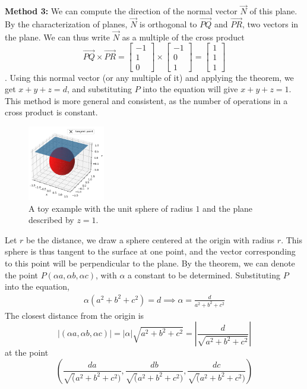 \textbf{Method 3:} We can compute the direction of the normal vector $\vec{N}$ of this plane. By the characterization of planes, $\vec{N}$ is orthogonal to $\overrightarrow{PQ}$ and $\overrightarrow{PR}$, two vectors in the plane. We can thus write $\vec{N}$ as a multiple of the cross product \[
	\overrightarrow{PQ} \times \overrightarrow{PR} = \begin{bmatrix}
		-1\\1\\0
	\end{bmatrix} \times \begin{bmatrix}
	-1\\0\\1
	\end{bmatrix} = \begin{bmatrix}
	1\\1\\1
	\end{bmatrix}
\]. Using this normal vector (or any multiple of it) and applying the theorem, we get $x+y+z=d$, and substituting $P$ into the equation will give $x+y+z=1$. This method is more general and consistent, as the number of operations in a cross product is constant.

\begin{figure}
	\centering
	\includegraphics[width=0.3\textwidth]{coordinate_geometry/tangent.png}
	\caption{A toy example with the unit sphere of radius $1$ and the plane described by $z=1$.}
\end{figure}
Let $r$ be the distance, we draw a sphere centered at the origin with radius $r$. This sphere is thus tangent to the surface at one point, and the vector corresponding to this point will be perpendicular to the plane. By the theorem, we can denote the point $P(\alpha a, \alpha b, \alpha c)$, with $\alpha$ a constant to be determined. Substituting $P$ into the equation, \begin{align*}
	\alpha (a^2+b^2+c^2) = d \implies \alpha = \frac{d}{a^2+b^2+c^2}
\end{align*}
The closest distance from the origin is \[
|(\alpha a, \alpha b, \alpha c)| = |\alpha| \sqrt{a^2+b^2+c^2} = \left| \frac{d}{\sqrt{a^2+b^2+c^2}}\right| 
\]
at the point \[
\left(\frac{da}{\sqrt(a^2+b^2+c^2)},\frac{db}{\sqrt(a^2+b^2+c^2)},\frac{dc}{\sqrt(a^2+b^2+c^2)}\right)
\]\ \\

